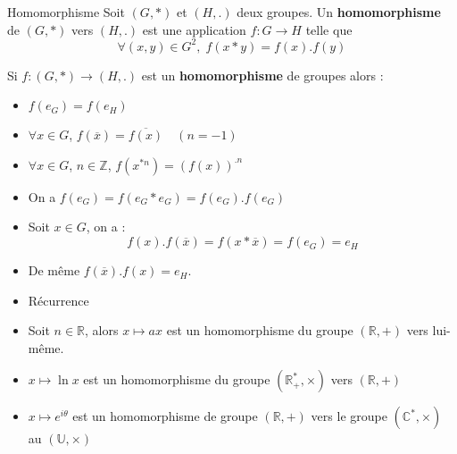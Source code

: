 \begin{Definition}[colbacktitle=red!75!black]{Homomorphisme}{}
Soit $(G, *)$ et $(H, .)$ deux groupes. Un \textbf{homomorphisme} de $(G, *)$ vers $(H, .)$ est une application $f: G \to H$ telle que 
\begin{equation}
  \forall (x, y) \in G ^{2}, \; f(x *y) = f(x) . f(y)
\end{equation}
\end{Definition}

\begin{Prop}{}{}
  Si $f : (G, *) \to (H, .)$ est un \textbf{homomorphisme} de groupes alors : 
  \begin{itemize}

      \item $f(e_G) =f(e_H)$ 
      \item $\forall x \in G$, $f( \overline{x}) = \overline{f(x)} \quad (n=-1)$ 
      \item $\forall x \in G$, $n \in \mathbb{Z}$, $f (x ^{*n}) = (f(x)) ^{.n}$
  \end{itemize}
\end{Prop}

\begin{myproof}{}{}
\begin{itemize}

    \item On a $f(e_G) = f(e_G * e_G) = f(e_G) . f(e_G)$ 
    \item Soit $x \in G$, on a : 
      \begin{equation}
        f(x) . f(\overline{x}) = f(x * \overline{x}) = f(e_G) = e_H
      \end{equation}
    \item De même $f(\overline{x}) . f(x) = e_H$.

    \item Récurrence

\end{itemize}



\end{myproof}

\begin{Example}{}{}
\begin{itemize}

    \item Soit $n \in \mathbb{R}$, alors $x \mapsto ax$ est un homomorphisme du groupe $(\mathbb{R}, +)$ vers lui-même. 

    \item $x \mapsto \ln x$ est un homomorphisme du groupe $(\mathbb{R}_+ ^{*}, \times)$ vers $(\mathbb{R}, +)$

    \item $x \mapsto e ^{i \theta}$ est un homomorphisme de groupe $(\mathbb{R}, +)$ vers le groupe $(\mathbb{C} ^{*}, \times)$ au $(\mathbb{U}, \times)$

\end{itemize}
\end{Example}

